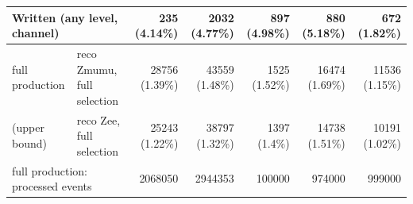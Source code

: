 \begin{tabular}{llrrrrr}
\midrule
\multicolumn{2}{l}{Written (any level, channel)} & 235 (4.14\%) & 2032 (4.77\%) & 897 (4.98\%) & 880 (5.18\%) & 672 (1.82\%) \\
\midrule
full production & reco Zmumu, full selection & 28756 (1.39\%) & 43559 (1.48\%) & 1525 (1.52\%) & 16474 (1.69\%) & 11536 (1.15\%) \\
(upper bound) & reco Zee, full selection & 25243 (1.22\%) & 38797 (1.32\%) & 1397 (1.4\%) & 14738 (1.51\%) & 10191 (1.02\%) \\
\multicolumn{2}{l}{full production: processed events} & 2068050 & 2944353 & 100000 & 974000 & 999000 \\
\bottomrule
\end{tabular}

